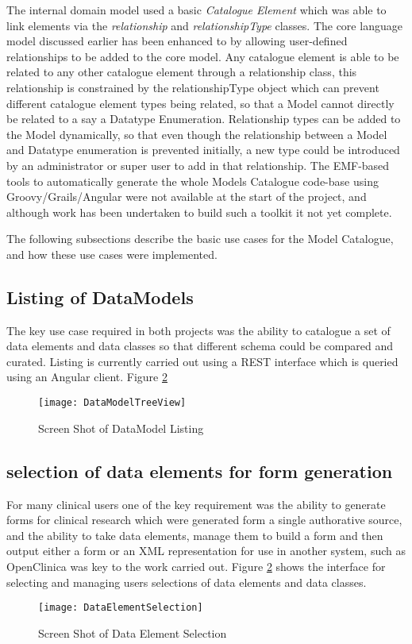 The internal domain model used a basic \emph{Catalogue Element} which was able to link elements via the \emph{relationship} and \emph{relationshipType} classes. The core language model discussed earlier has been enhanced to by allowing user-defined relationships to be added to the core model. Any catalogue element is able to be related to any other catalogue element through a relationship class, this relationship is constrained by the relationshipType object which can prevent different catalogue element types being related, so that a Model cannot directly be related to a say a Datatype Enumeration. Relationship types can be added to the Model dynamically, so that even though the relationship between a Model and Datatype enumeration is prevented initially, a new type could be introduced by an administrator or super user to add in that relationship. The EMF-based tools to automatically generate the whole Models Catalogue code-base using Groovy/Grails/Angular were not available at the start of the project, and although work has been undertaken to build such a toolkit it not yet complete.  

The following subsections describe the basic use cases for the Model Catalogue, and how these use cases were implemented. 
\subsection{Listing of DataModels}
The key use case required in both projects was the ability to catalogue a set of data elements and data classes so that different schema could be compared and curated. Listing is currently carried out using a REST interface which is queried using an Angular client. Figure \ref{fig:treeviewOfDataModel}
\begin{figure}[here]
	\texttt{[image: DataModelTreeView]}
	\caption{Screen Shot of DataModel Listing} 
	\label{fig:treeviewOfDataModel}	
\end{figure}

\subsection{selection of data elements for form generation}
For many clinical users one of the key requirement was the ability to generate forms for clinical research which were generated form a single authorative source, and the ability to take data elements, manage them to build a form and then output either a form or an XML representation for use in another system, such as OpenClinica was key to the work carried out. Figure \ref{fig:treeviewOfDataModel} shows the interface for selecting and managing users selections of data elements and data classes.
\begin{figure}[here]
	\texttt{[image: DataElementSelection]}
	\caption{Screen Shot of Data Element Selection} 
	\label{fig:treeviewOfDataModel}	
\end{figure}


